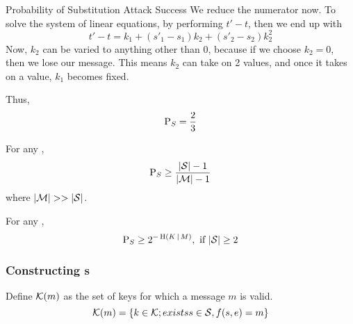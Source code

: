 \begin{example}{Probability of Substitution Attack Success}
  We reduce the numerator now.
  To solve the system of linear equations, by performing $t' - t$, then we end up with
  \begin{equation*}
    t' - t = k_{1} + (s'_{1} - s_{1}) k_{2} + (s'_{2} - s_{2}) k_{2}^{2}
  \end{equation*}
  Now, $k_{2}$ can be varied to anything other than 0, because if we choose $k_{2} = 0$, then we lose our message.
  This means $k_{2}$ can take on 2 values, and once it takes on a value, $k_{1}$ becomes fixed.

  Thus,
  \begin{equation*}
    \operatorname{\operatorname{P}}_{S} = \frac{2}{3}
  \end{equation*}
\end{example}

\begin{theorem}\label{thm:Attack_Authentication_Code-Substitution-Success_Bounds}
  For any ,
  \begin{equation}\label{eq:Attack_Authentication_Code-Substitution-Success_Bound}
    \operatorname{\operatorname{P}}_{S} \geq \frac{\lvert \operatorname{\mathcal{S}} \rvert - 1}{\lvert \operatorname{\mathcal{M}} \rvert - 1}
  \end{equation}
  where $\lvert \operatorname{\mathcal{M}} \rvert >> \lvert \operatorname{\mathcal{S}} \rvert$.
\end{theorem}

\begin{theorem}\label{thm:Substitution-Simmons_Bound}
  For any ,
  \begin{equation}\label{eq:Substitution-Simmons_Bound}
    \operatorname{\operatorname{P}}_{S} \geq 2^{-\operatorname{\operatorname{H}}(K \operatorname{\vert} M)}, \text{ if } \lvert \operatorname{\mathcal{S}} \rvert \geq 2
  \end{equation}
\end{theorem}

\subsubsection{Constructing s}\label{subsubsec:Authentication_Code-Construction}
Define $\operatorname{\mathcal{K}}(m)$ as the set of keys for which a message $m$ is valid.
\begin{equation}\label{eq:Authentication_Code-Keys_Message_Valid}
  \operatorname{\mathcal{K}}(m) = \lbrace k \in \operatorname{\mathcal{K}}; exists s \in \operatorname{\mathcal{S}}, f(s, e) = m \rbrace
\end{equation}

